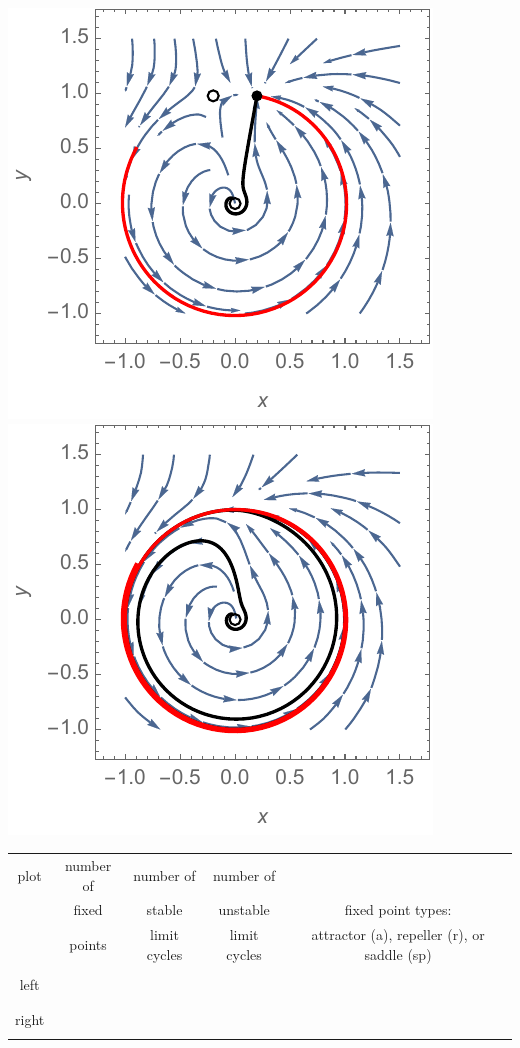 \documentclass[12pt,letterpaper,noanswers]{exam}
\begin{document}
\includegraphics{img/C20-21sniperp1.pdf}
\includegraphics{img/C20-21sniperp1b.pdf}

\begin{tabular}{| c | c | c | c | c |}
\hline
plot & number of & number of  & number of  & \hspace{3in} \\
& fixed & stable & unstable &fixed point types:   \\
&  points  & limit cycles & limit cycles & attractor (a), repeller (r), or saddle (sp) \\
\hline
& & & &\\
left& & & & \\
& & & &\\
\hline
& & & &\\
right& & & & \\
& & & &\\
\hline
\end{tabular}
\end{document}
